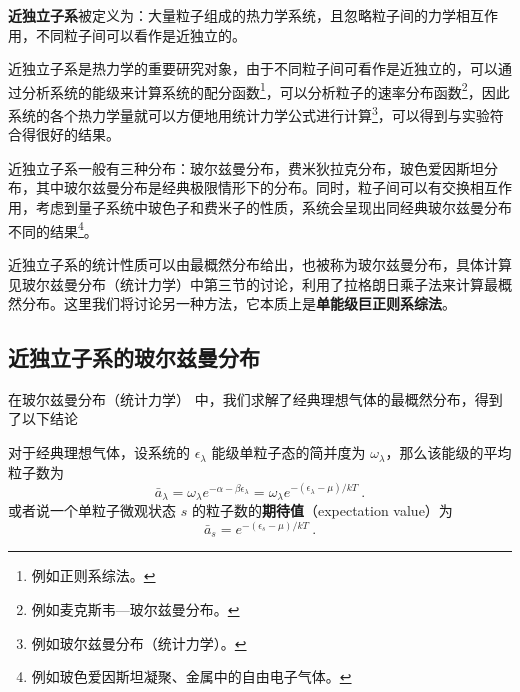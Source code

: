 

\textbf{近独立子系}被定义为：大量粒子组成的热力学系统，且忽略粒子间的力学相互作用，不同粒子间可以看作是近独立的。

近独立子系是热力学的重要研究对象，由于不同粒子间可看作是近独立的，可以通过分析系统的能级来计算系统的配分函数\footnote{例如正则系综法。}，可以分析粒子的速率分布函数\footnote{例如麦克斯韦—玻尔兹曼分布。}，因此系统的各个热力学量就可以方便地用统计力学公式进行计算\footnote{例如玻尔兹曼分布（统计力学）。}，可以得到与实验符合得很好的结果。

近独立子系一般有三种分布：玻尔兹曼分布，费米狄拉克分布，玻色爱因斯坦分布，其中玻尔兹曼分布是经典极限情形下的分布。同时，粒子间可以有交换相互作用，考虑到量子系统中玻色子和费米子的性质，系统会呈现出同经典玻尔兹曼分布不同的结果\footnote{例如玻色爱因斯坦凝聚、金属中的自由电子气体。}。

近独立子系的统计性质可以由最概然分布给出，也被称为玻尔兹曼分布，具体计算见玻尔兹曼分布（统计力学）中第三节的讨论，利用了拉格朗日乘子法来计算最概然分布。这里我们将讨论另一种方法，它本质上是\textbf{单能级巨正则系综法}。

\subsection{近独立子系的玻尔兹曼分布}
在玻尔兹曼分布（统计力学） 中，我们求解了经典理想气体的最概然分布，得到了以下结论
\begin{theorem}{}
对于经典理想气体，设系统的 $\epsilon_\lambda$ 能级单粒子态的简并度为 $\omega_\lambda$，那么该能级的平均粒子数为
\begin{equation}
\bar a_\lambda = \omega_\lambda e^{-\alpha-\beta\epsilon_\lambda}=
\omega_\lambda e^{-(\epsilon_\lambda-\mu)/kT}~.
\end{equation}
或者说一个单粒子微观状态 $s$ 的粒子数的\textbf{期待值}（expectation value）为
\begin{equation}
\bar a_s= e^{-(\epsilon_s-\mu)/kT}~.
\end{equation}
\end{theorem}

